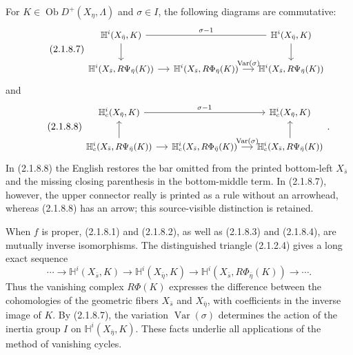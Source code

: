 For $K\in\operatorname{Ob}D^+(X_\eta,\Lambda)$ and $\sigma\in I$,
the following diagrams are commutative:
\begin{equation}\tag{2.1.8.7}
\begin{tikzcd}[column sep=small, cells={nodes={font=\small}}]
\mathbb H^i(X_{\bar\eta},K)
  \arrow[rr, dash, "\sigma-1"] \arrow[d]
  & {} & \mathbb H^i(X_{\bar\eta},K) \arrow[d] \\
\mathbb H^i(X_{\bar s},R\Psi_{\bar\eta}(K)) \arrow[r]
  & \mathbb H^i(X_{\bar s},R\Phi_{\bar\eta}(K))
      \arrow[r, "\operatorname{Var}(\sigma)"]
  & \mathbb H^i(X_{\bar s},R\Psi_{\bar\eta}(K))
\end{tikzcd}
\end{equation}
and
\begin{equation}\tag{2.1.8.8}
\begin{tikzcd}[column sep=small, cells={nodes={font=\small}}]
\mathbb H_c^i(X_{\bar\eta},K)
  \arrow[rr, "\sigma-1"]
  & {} & \mathbb H_c^i(X_{\bar\eta},K) \\
\mathbb H_c^i(X_{\bar s},R\Psi_{\bar\eta}(K)) \arrow[r] \arrow[u]
  & \mathbb H_c^i(X_{\bar s},R\Phi_{\bar\eta}(K))
      \arrow[r, "\operatorname{Var}(\sigma)"]
  & \mathbb H_c^i(X_{\bar s},R\Psi_{\bar\eta}(K)) \arrow[u]
\end{tikzcd}
.\end{equation}
In (2.1.8.8) the English restores the bar omitted from the printed
bottom-left $X_{\bar s}$ and the missing closing parenthesis in the
bottom-middle term.  In (2.1.8.7), however, the upper connector really
is printed as a rule without an arrowhead, whereas (2.1.8.8) has an
arrow; this source-visible distinction is retained.

When $f$ is proper, (2.1.8.1) and (2.1.8.2), as well as (2.1.8.3) and
(2.1.8.4), are mutually inverse isomorphisms.  The distinguished
triangle (2.1.2.4) gives a long exact sequence
\begin{equation}\tag{2.1.8.9}
\cdots\longrightarrow\mathbb H^i(X_{\bar s},K)
\longrightarrow\mathbb H^i(X_{\bar\eta},K)
\longrightarrow\mathbb H^i(X_{\bar s},R\Phi_{\bar\eta}(K))
\longrightarrow\cdots.
\end{equation}
Thus the vanishing complex $R\Phi(K)$ expresses the difference between
the cohomologies of the geometric fibers $X_{\bar s}$ and
$X_{\bar\eta}$, with coefficients in the inverse image of $K$.
By (2.1.8.7), the variation $\operatorname{Var}(\sigma)$ determines
the action of the inertia group $I$ on
$\mathbb H^i(X_{\bar\eta},K)$.  These facts underlie all applications
of the method of vanishing cycles.

